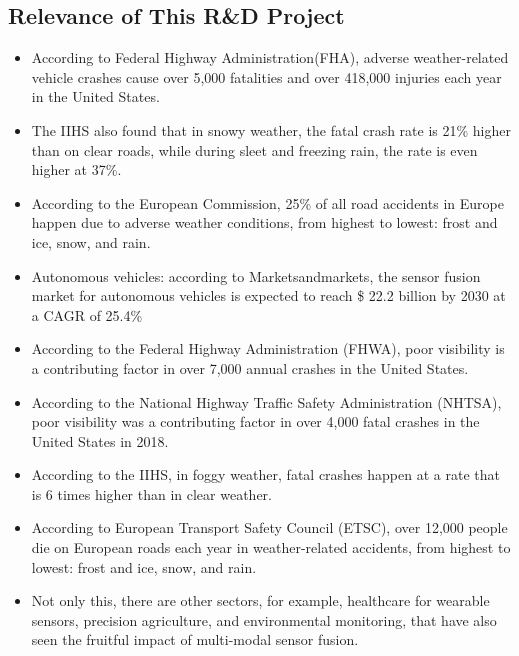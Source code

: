\documentclass[rnd]{mas_proposal}
\begin{document}
\subsection{Relevance of This R\&D Project}
\begin{itemize}

    \item According to Federal Highway Administration(FHA), adverse weather-related vehicle crashes cause over 5,000 fatalities and over 418,000 injuries each year in the United States. 
    \cite{federal-highway-administration-no-date}

    \item The IIHS also found that in snowy weather, the fatal crash rate is 21\% higher than on clear roads, while during sleet and freezing rain, the rate is even higher at 37\%.

    \item According to the European Commission, 25\% of all road accidents in Europe happen due to adverse weather conditions, from highest to lowest: frost and ice, snow, and rain.
    \cite{cookson-2022}

    \item Autonomous vehicles: according to Marketsandmarkets, the sensor fusion market for autonomous vehicles is expected to reach \$ 22.2 billion by 2030 at a CAGR of 25.4\%  
    \cite{marketsandmarkets}

    \item According to the Federal Highway Administration (FHWA), poor visibility is a contributing factor in over 7,000 annual crashes in the United States.
    
    \item According to the National Highway Traffic Safety Administration (NHTSA), poor visibility was a contributing factor in over 4,000 fatal crashes in the United States in 2018.
    
    \item According to the IIHS, in foggy weather, fatal crashes happen at a rate that is 6 times higher than in clear weather.
    
    \item According to European Transport Safety Council (ETSC), over 12,000 people die on European roads each year in weather-related accidents, from highest to lowest: frost and ice, snow, and rain.
    
    \item Not only this, there are other sectors, for example, healthcare for wearable sensors, precision agriculture, and environmental monitoring, that have also seen the fruitful impact of multi-modal sensor fusion.


\end{itemize}
\end{document}
